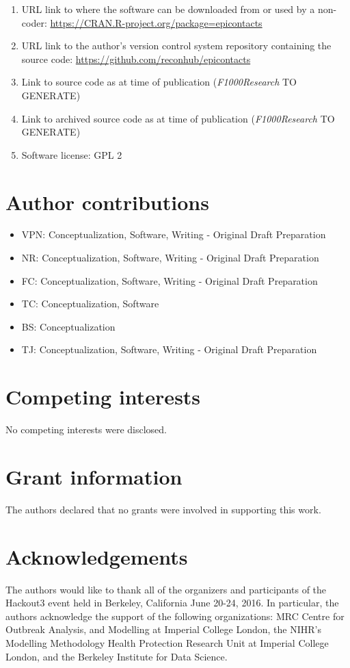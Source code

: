 \documentclass[9pt,a4paper,]{extarticle}
\theoremstyle{definition}
\theoremstyle{definition}
\theoremstyle{definition}
\theoremstyle{remark}
\begin{document}
\begin{enumerate}
\def\labelenumi{\arabic{enumi}.}
\item
  URL link to where the software can be downloaded from or used by a non-coder: \url{https://CRAN.R-project.org/package=epicontacts}
\item
  URL link to the author's version control system repository containing the source code: \url{https://github.com/reconhub/epicontacts}
\item
  Link to source code as at time of publication (\emph{F1000Research} TO GENERATE)
\item
  Link to archived source code as at time of publication (\emph{F1000Research} TO GENERATE)
\item
  Software license: GPL 2
\end{enumerate}

\section{Author contributions}\label{author-contributions}

\begin{itemize}
\item
  VPN: Conceptualization, Software, Writing - Original Draft Preparation
\item
  NR: Conceptualization, Software, Writing - Original Draft Preparation
\item
  FC: Conceptualization, Software, Writing - Original Draft Preparation
\item
  TC: Conceptualization, Software
\item
  BS: Conceptualization
\item
  TJ: Conceptualization, Software, Writing - Original Draft Preparation
\end{itemize}

\section{Competing interests}\label{competing-interests}

No competing interests were disclosed.

\section{Grant information}\label{grant-information}

The authors declared that no grants were involved in supporting this work.

\section{Acknowledgements}\label{acknowledgements}

The authors would like to thank all of the organizers and participants of the Hackout3 event held in Berkeley, California June 20-24, 2016. In particular, the authors acknowledge the support of the following organizations: MRC Centre for Outbreak Analysis, and Modelling at Imperial College London, the NIHR's Modelling Methodology Health Protection Research Unit at Imperial College London, and the Berkeley Institute for Data Science.

{\small}
\end{document}
